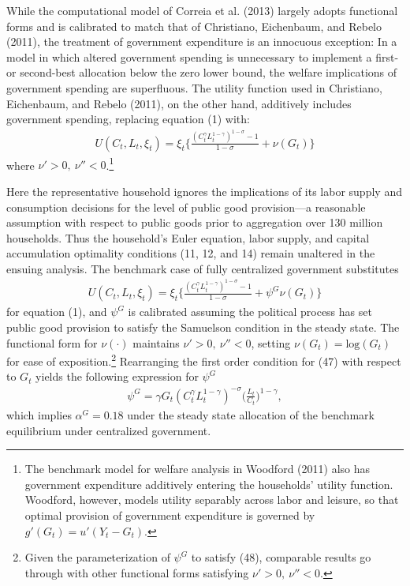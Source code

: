 \documentclass[12pt,letterpaper]{article}
\begin{document}
While the computational model of Correia et al. (2013) largely adopts functional forms and is calibrated to match that of Christiano, Eichenbaum, and Rebelo (2011), the treatment of government expenditure is an innocuous exception: In a model in which altered government spending is unnecessary to implement a first- or second-best allocation below the zero lower bound, the welfare implications of government spending are superfluous. The utility function used in Christiano, Eichenbaum, and Rebelo (2011), on the other hand, additively includes government spending, replacing equation (1) with:
\begin{align}
U(C_t,L_t,\xi_t) =  \xi_t \Big\{ \frac{(C_t^\gamma L_t^{1-\gamma})^{1-\sigma} - 1}{1 - \sigma} + \nu (G_t) \Big\} 
\end{align}
where $\nu' >0, \ \nu''<0$.\footnote{The benchmark model for welfare analysis in Woodford (2011) also has government expenditure additively entering the households' utility function. Woodford, however, models utility separably across labor and leisure, so that optimal provision of government expenditure is governed by $g'(G_t) = u'(Y_t - G_t)$.}

Here the representative household ignores the implications of its labor supply and consumption decisions for the level of public good provision---a reasonable assumption with respect to public goods prior to aggregation over 130 million households. Thus the household's Euler equation, labor supply, and capital accumulation optimality conditions (11, 12, and 14) remain unaltered in the ensuing analysis. The benchmark case of fully centralized government substitutes
\begin{align}
U(C_t,L_t,\xi_t) =  \xi_t \Big\{  \frac{(C_t^\gamma L_t^{1-\gamma})^{1-\sigma} - 1}{1 - \sigma} + \psi^G \nu (G_t) \Big\}
\end{align}
for equation (1), and $\psi^G$ is calibrated assuming the political process has set public good provision to satisfy the Samuelson condition in the steady state. The functional form for $\nu(\cdotp)$ maintains $\nu' >0, \ \nu''<0$, setting $\nu(G_t) = \text{log}(G_t)$ for ease of exposition.\footnote{Given the parameterization of $\psi^G$ to satisfy (48), comparable results go through with other functional forms satisfying $\nu' >0, \ \nu''<0$.} Rearranging the first order condition for (47) with respect to $G_t$ yields the following expression for $\psi^G$
\begin{align}
\psi^G = \gamma G_t  (C_t^\gamma L_t^{1-\gamma})^{-\sigma} \Big( \frac{L_t}{C_t} \Big) ^{1-\gamma},
\end{align}
which implies $\alpha^G = 0.18$ under the steady state allocation of the benchmark equilibrium under centralized government. 
\end{document}
